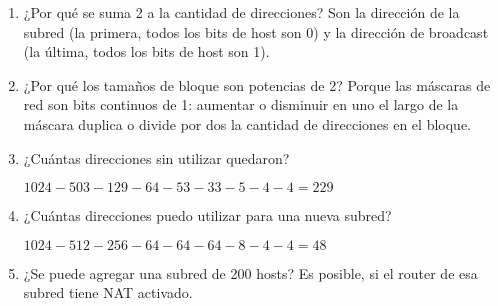 \begin{enumerate}[start=2, left=0cm]
    \item ¿Por qué se suma 2 a la cantidad de direcciones? Son la dirección de la subred (la primera, todos los bits de host son 0) y la dirección de broadcast (la última, todos los bits de host son 1).

    \item ¿Por qué los tamaños de bloque son potencias de 2? Porque las máscaras de red son bits continuos de 1: aumentar o disminuir en uno el largo de la máscara duplica o divide por dos la cantidad de direcciones en el bloque.

    \item ¿Cuántas direcciones sin utilizar quedaron?
    
    \hfil$1024 - 503 - 129 - 64 - 53 - 33 - 5 - 4 - 4 = 229$\hfil

    \item ¿Cuántas direcciones puedo utilizar para una nueva subred?
    
    \hfil$1024 - 512 - 256 - 64 - 64 - 64 - 8 - 4 - 4 = 48$\hfil

    \item ¿Se puede agregar una subred de 200 hosts? Es posible, si el router de esa subred tiene NAT activado.

\end{enumerate}
